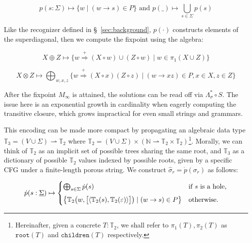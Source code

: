 \documentclass[sigplan,review,anonymous,acmsmall]{acmart}\settopmatter{printfolios=false,printccs=false,printacmref=false}
\begin{document}
  \begin{equation}
    p(s: \Sigma) \mapsto \{w \mid (w \rightarrow s)\in P\} \text{ and } p(\_) \mapsto \bigcup_{s\in \Sigma} p(s)
  \end{equation}

  Like the recognizer defined in \S~\ref{sec:background}, $p(\cdot)$ constructs elements of the superdiagonal, then we compute the fixpoint using the algebra:

  \begin{equation}
    X \oplus Z \mapsto \big\{w \stackrel{+}{\Rightarrow} (X \circ w) \cup (Z \circ w) \mid w \in \pi_1(X \cup Z)\big\}
  \end{equation}

  \begin{equation}
    X \otimes Z \mapsto \bigoplus_{w, x, z}\big\{w \stackrel{+}{\Rightarrow} (X\circ x)(Z\circ z) \mid (w\rightarrow xz) \in P, x\in X, z\in Z\big\}
  \end{equation}

  \noindent After the fixpoint $M_\infty$ is attained, the solutions can be read off via $\Lambda_\sigma^* \circ S$. The issue here is an exponential growth in cardinality when eagerly computing the transitive closure, which grows impractical for even small strings and grammars.

  This encoding can be made more compact by propagating an algebraic data type $\mathbb{T}_3 = (V \cup \Sigma) \rightharpoonup \mathbb{T}_2$ where $\mathbb{T}_2 = (V \cup \Sigma) \times (\mathbb{N} \rightharpoonup \mathbb{T}_2\times\mathbb{T}_2)$\footnote{Hereinafter, given a concrete $T:\mathbb{T}_2$, we shall refer to $\pi_1(T), \pi_2(T)$ as $\texttt{root}(T)$ and $\texttt{children}(T)$ respectively.}. Morally, we can think of $\mathbb{T}_2$ as an implicit set of possible trees sharing the same root, and $\mathbb{T}_3$ as a dictionary of possible $\mathbb{T}_2$ values indexed by possible roots, given by a specific CFG under a finite-length porous string. We construct $\hat\sigma_r = \dot{p}(\sigma_r)$ as follows:

  \begin{equation}
    \dot{p}(s: \underline\Sigma) \mapsto \begin{cases}
                                           \bigoplus_{s\in \Sigma} \dot{p}(s) & \text{if $s$ is a hole,} \vspace{5pt}\\
                                           \big\{\mathbb{T}_2\big(w, \big[\langle\mathbb{T}_2(s), \mathbb{T}_2(\varepsilon)\rangle\big]\big) \mid (w \rightarrow s)\in P\big\} & \text{otherwise.}
    \end{cases}
  \end{equation}
\end{document}
